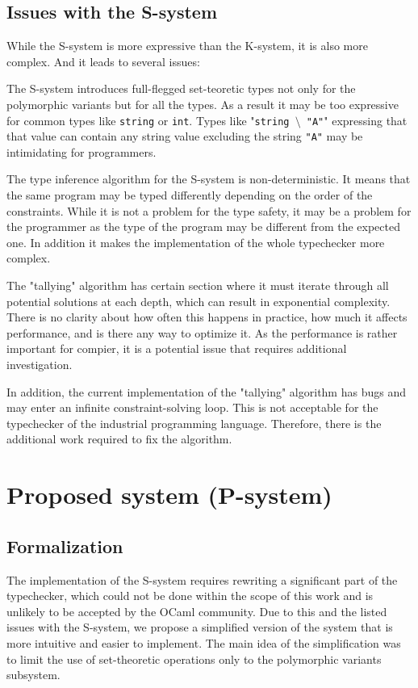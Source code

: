\documentclass[a4paper,11pt,oneside]{article}
\theoremstyle{definition}
\begin{document}
\subsection{Issues with the S-system}

While the S-system is more expressive than the K-system, it is also more complex. And it leads to several issues:

The S-system introduces full-flegged set-teoretic types not only for the polymorphic variants but for all the types.
As a result it may be too expressive for common types like \texttt{string} or \texttt{int}.
Types like "\texttt{string $\setminus$ "A"}" expressing that that value can contain any string value excluding the string \texttt{"A"} may be intimidating
for programmers.

The type inference algorithm for the S-system is non-deterministic.
It means that the same program may be typed differently depending on the order of the constraints.
While it is not a problem for the type safety, it may be a problem for the programmer as the type of the program may be different from the expected one.
In addition it makes the implementation of the whole typechecker more complex.

The "tallying" algorithm has certain section where it must iterate through all potential solutions at each depth, which can result in exponential complexity.
There is no clarity about how often this happens in practice, how much it affects performance, and is there any way to optimize it.
As the performance is rather important for compier, it is a potential issue that requires additional investigation.

In addition, the current implementation of the "tallying" algorithm has bugs and may enter an infinite constraint-solving loop.
This is not acceptable for the typechecker of the industrial programming language.
Therefore, there is the additional work required to fix the algorithm.

\section{Proposed system (P-system)}

\subsection{Formalization}

The implementation of the S-system requires rewriting a significant part of the typechecker, which could not be done within the scope of this work and is unlikely to be accepted by the OCaml community.
Due to this and the listed issues with the S-system, we propose a simplified version of the system that is more intuitive and easier to implement.
The main idea of the simplification was to limit the use of set-theoretic operations only to the polymorphic variants subsystem.
\end{document}
